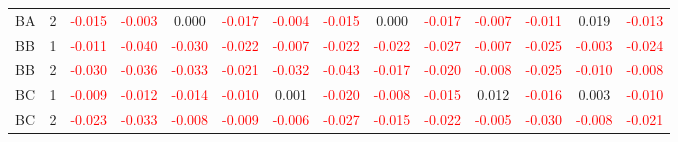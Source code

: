 \begin{table}[H]
{\begin{tabular}{llcccccccccccc}
BA & 2 & \textcolor{red}{-0.015} & \textcolor{red}{-0.003} & 0.000 & \textcolor{red}{-0.017} & \textcolor{red}{-0.004} & \textcolor{red}{-0.015} & 0.000 & \textcolor{red}{-0.017} & \textcolor{red}{-0.007} & \textcolor{red}{-0.011} & 0.019 & \textcolor{red}{-0.013}\\
BB & 1 & \textcolor{red}{-0.011} & \textcolor{red}{-0.040} & \textcolor{red}{-0.030} & \textcolor{red}{-0.022} & \textcolor{red}{-0.007} & \textcolor{red}{-0.022} & \textcolor{red}{-0.022} & \textcolor{red}{-0.027} & \textcolor{red}{-0.007} & \textcolor{red}{-0.025} & \textcolor{red}{-0.003} & \textcolor{red}{-0.024}\\
BB & 2 & \textcolor{red}{-0.030} & \textcolor{red}{-0.036} & \textcolor{red}{-0.033} & \textcolor{red}{-0.021} & \textcolor{red}{-0.032} & \textcolor{red}{-0.043} & \textcolor{red}{-0.017} & \textcolor{red}{-0.020} & \textcolor{red}{-0.008} & \textcolor{red}{-0.025} & \textcolor{red}{-0.010} & \textcolor{red}{-0.008}\\
BC & 1 & \textcolor{red}{-0.009} & \textcolor{red}{-0.012} & \textcolor{red}{-0.014} & \textcolor{red}{-0.010} & 0.001 & \textcolor{red}{-0.020} & \textcolor{red}{-0.008} & \textcolor{red}{-0.015} & 0.012 & \textcolor{red}{-0.016} & 0.003 & \textcolor{red}{-0.010}\\
BC & 2 & \textcolor{red}{-0.023} & \textcolor{red}{-0.033} & \textcolor{red}{-0.008} & \textcolor{red}{-0.009} & \textcolor{red}{-0.006} & \textcolor{red}{-0.027} & \textcolor{red}{-0.015} & \textcolor{red}{-0.022} & \textcolor{red}{-0.005} & \textcolor{red}{-0.030} & \textcolor{red}{-0.008} & \textcolor{red}{-0.021}\\
\hline
    \end{tabular}%
    }
    \label{tab:cen7_cov}
\end{table}

